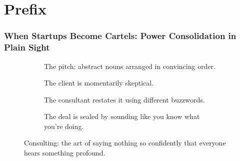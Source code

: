 \part{Prefix}

\section*{When Startups Become Cartels: Power Consolidation in Plain Sight}

\vfill

\begin{figure}[H]
  \centering
  
  \begin{subfigure}[t]{0.45\textwidth}
  \centering
  \caption*{The pitch: abstract nouns arranged in convincing order.}
  \end{subfigure}
  \hfill
  \begin{subfigure}[t]{0.45\textwidth}
  \centering
  \caption*{The client is momentarily skeptical.}
  \end{subfigure}
  
  \vspace{1em}
  
  \begin{subfigure}[t]{0.45\textwidth}
  \centering
  \caption*{The consultant restates it using different buzzwords.}
  \end{subfigure}
  \hfill
  \begin{subfigure}[t]{0.45\textwidth}
  \centering
  \caption*{The deal is sealed by sounding like you know what you’re doing.}
  \end{subfigure}
  
  \caption*{Consulting: the art of saying nothing so confidently that everyone hears something profound.}
  \end{figure}




